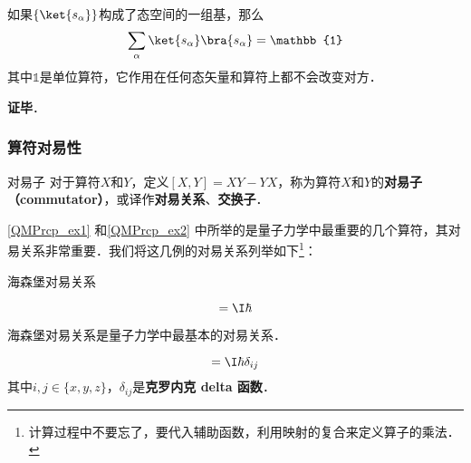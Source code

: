 如果$\{\ket{s_\alpha}\}$构成了态空间的一组基，那么
\begin{equation}
\sum_\alpha \ket{s_\alpha}\bra{s_\alpha} = \mathbb{1}
\end{equation}
其中$\mathbb{1}$是单位算符，它作用在任何态矢量和算符上都不会改变对方．


\textbf{证毕}．







\subsubsection{算符对易性}



\begin{definition}{对易子}\label{QMPrcp_def13}
对于算符$X$和$Y$，定义$[X, Y]=XY-YX$，称为算符$X$和$Y$的\textbf{对易子（commutator）}，或译作\textbf{对易关系}、\textbf{交换子}．
\end{definition}

\autoref{QMPrcp_ex1} 和\autoref{QMPrcp_ex2} 中所举的是量子力学中最重要的几个算符，其对易关系非常重要．我们将这几例的对易关系列举如下\footnote{计算过程中不要忘了，要代入辅助函数，利用映射的复合来定义算子的乘法．}：

\begin{theorem}{海森堡对易关系}\label{QMPrcp_the5}

\begin{equation}
[\hat{x}, \hat{p}_x] = \I\hbar
\end{equation}

\end{theorem}



海森堡对易关系是量子力学中最基本的对易关系．



\begin{corollary}{}\label{QMPrcp_cor1}

\begin{equation}
[\hat{i}, \hat{p}_j]=\I\hbar\delta_{ij}
\end{equation}
其中$i, j\in\{x, y, z\}$，$\delta_{ij}$是\textbf{克罗内克 delta 函数}．
\end{corollary}

